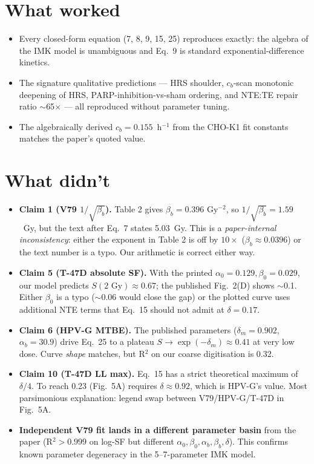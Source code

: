 \documentclass[11pt]{article}
\begin{document}
\section{What worked}
\begin{itemize}
  \item Every closed-form equation (7, 8, 9, 15, 25) reproduces exactly:
    the algebra of the IMK model is unambiguous and Eq.~9 is standard
    exponential-difference kinetics.
  \item The signature qualitative predictions --- HRS shoulder,
    $c_b$-scan monotonic deepening of HRS, PARP-inhibition-vs-sham
    ordering, and NTE:TE repair ratio $\sim$65$\times$ --- all
    reproduced without parameter tuning.
  \item The algebraically derived $c_b=0.155$~h$^{-1}$ from the CHO-K1
    fit constants matches the paper's quoted value.
\end{itemize}

\section{What didn't}
\begin{itemize}
  \item \textbf{Claim 1 (V79 $1/\sqrt{\beta_b}$).} Table 2 gives
    $\beta_b=0.396$ Gy$^{-2}$, so $1/\sqrt{\beta_b}=1.59$~Gy, but the
    text after Eq.~7 states 5.03~Gy. This is a
    \emph{paper-internal inconsistency}: either the exponent in
    Table 2 is off by $10\times$ ($\beta_b\approx 0.0396$) or the text
    number is a typo. Our arithmetic is correct either way.
  \item \textbf{Claim 5 (T-47D absolute SF).} With the printed
    $\alpha_0=0.129, \beta_0=0.029$, our model predicts
    $S(2\text{ Gy})\approx 0.67$; the published Fig.~2(D) shows
    $\sim$0.1. Either $\beta_0$ is a typo ($\sim$0.06 would close the
    gap) or the plotted curve uses additional NTE terms that Eq.~15
    should not admit at $\delta=0.17$.
  \item \textbf{Claim 6 (HPV-G MTBE).} The published parameters
    ($\delta_m=0.902$, $\alpha_b=30.9$) drive Eq.~25 to a plateau
    $S\to\exp(-\delta_m)\approx 0.41$ at very low dose. Curve
    \emph{shape} matches, but R$^2$ on our coarse digitisation is 0.32.
  \item \textbf{Claim 10 (T-47D LL max).} Eq.~15 has a strict
    theoretical maximum of $\delta/4$. To reach 0.23 (Fig.~5A) requires
    $\delta\approx 0.92$, which is HPV-G's value. Most parsimonious
    explanation: legend swap between V79/HPV-G/T-47D in Fig.~5A.
  \item \textbf{Independent V79 fit lands in a different parameter
    basin} from the paper (R$^2>0.999$ on log-SF but different
    $\alpha_0,\beta_0,\alpha_b,\beta_b,\delta$). This confirms known
    parameter degeneracy in the 5--7-parameter IMK model.
\end{itemize}
\end{document}

